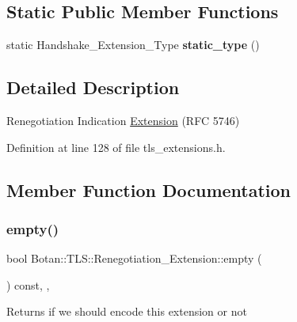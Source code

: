 \subsection*{Static Public Member Functions}
\begin{DoxyCompactItemize}
\item 
\mbox{\label{class_botan_1_1_t_l_s_1_1_renegotiation___extension_aead75994d58716663c90f9c2dbf2cbf0}} 
static Handshake\+\_\+\+Extension\+\_\+\+Type {\bfseries static\+\_\+type} ()
\end{DoxyCompactItemize}


\subsection{Detailed Description}
Renegotiation Indication \mbox{\hyperlink{class_botan_1_1_t_l_s_1_1_extension}{Extension}} (R\+FC 5746) 

Definition at line 128 of file tls\+\_\+extensions.\+h.



\subsection{Member Function Documentation}
\mbox{\label{class_botan_1_1_t_l_s_1_1_renegotiation___extension_a3e8751e4089301b3d9b39e7e2028573e}} 
\subsubsection{\texorpdfstring{empty()}{empty()}}
{\footnotesize\ttfamily bool Botan\+::\+T\+L\+S\+::\+Renegotiation\+\_\+\+Extension\+::empty (\begin{DoxyParamCaption}{ }\end{DoxyParamCaption}) const\hspace{0.3cm}{\ttfamily [inline]}, {\ttfamily [override]}, {\ttfamily [virtual]}}

\begin{DoxyReturn}{Returns}
if we should encode this extension or not 
\end{DoxyReturn}


